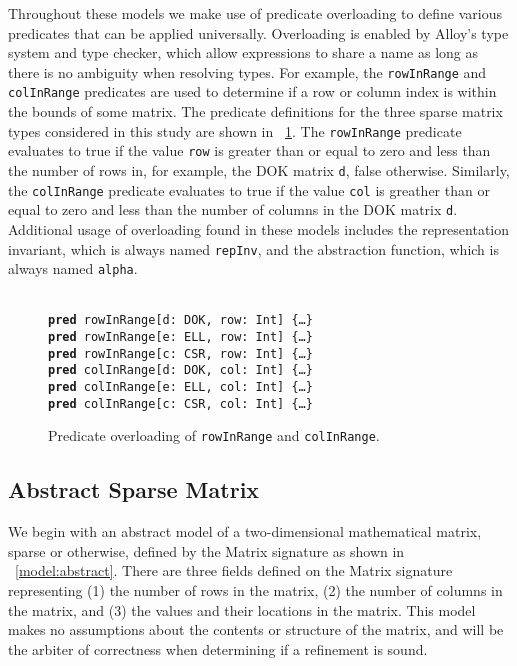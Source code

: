 \documentclass[11pt,conference]{IEEEtran}
\newenvironment{myquote}{\list{}{\leftmargin=12pt\rightmargin=0pt}\item[]}{\endlist}
\def\Bpred{\textbf{pred} }
\begin{document}
Throughout these models we make use of predicate overloading to define various predicates that can be applied universally.  Overloading is enabled by Alloy's type system and type checker, which allow expressions to share a name as long as there is no ambiguity when resolving types.  For example, the \texttt{rowInRange} and \texttt{colInRange} predicates are used to determine if a row or column index is within the bounds of some matrix.  The predicate definitions for the three sparse matrix types considered in this study are shown in \figurename~\ref{fig:overload}.  The \texttt{rowInRange} predicate evaluates to true if the value \texttt{row} is greater than or equal to zero and less than the number of rows in, for example, the DOK matrix \texttt{d}, false otherwise.  Similarly, the \texttt{colInRange} predicate evaluates to true if the value \texttt{col} is greather than or equal to zero and less than the number of columns in the DOK matrix \texttt{d}.  Additional usage of overloading found in these models includes the representation invariant, which is always named \texttt{repInv}, and the abstraction function, which is always named \texttt{alpha}.

\begin{figure}
\centering
\begin{myquote}\small{\texttt{\\
\Bpred rowInRange[d: DOK, row: Int] \{\ldots\}\\
\Bpred rowInRange[e: ELL, row: Int] \{\ldots\}\\
\Bpred rowInRange[c: CSR, row: Int] \{\ldots\}\\
\Bpred colInRange[d: DOK, col: Int] \{\ldots\}\\
\Bpred colInRange[e: ELL, col: Int] \{\ldots\}\\
\Bpred colInRange[c: CSR, col: Int] \{\ldots\}\\
}}
\end{myquote}
\caption{Predicate overloading of \texttt{rowInRange} and \texttt{colInRange}.}
\label{fig:overload}
\end{figure}

\subsection{Abstract Sparse Matrix}

We begin with an abstract model of a two-dimensional mathematical matrix, sparse or otherwise, defined by the Matrix signature as shown in \figurename~\ref{model:abstract}.  There are three fields defined on the Matrix signature representing (1) the number of rows in the matrix, (2) the number of columns in the matrix, and (3) the values and their locations in the matrix.  This model makes no assumptions about the contents or structure of the matrix, and will be the arbiter of correctness when determining if a refinement is sound.
\end{document}
